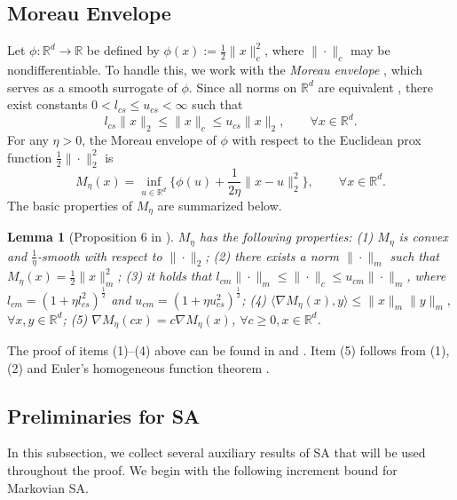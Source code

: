 \documentclass[11pt,letterpaper]{article}
\theoremstyle{plain}
\newtheorem{lemma}{Lemma}
\theoremstyle{definition}
\theoremstyle{remark}
\newcommand{\R}{\mathbb{R}}
\begin{document}
\subsection{Moreau Envelope}
Let $\phi:\R^d\to\R$ be defined by $\phi(x):=\tfrac12\|x\|_c^2$, where $\|\cdot\|_c$ may be nondifferentiable.  
To handle this, we work with the \emph{Moreau envelope} \citep{parikh2014proximal,chen2024lyapunov,chen2020finite}, which serves as a smooth surrogate of $\phi$.  
Since all norms on $\R^d$ are equivalent \citep{folland1999real}, there exist constants $0<l_{cs}\le u_{cs}<\infty$ such that
\[
l_{cs}\|x\|_2 \le \|x\|_c \le u_{cs}\|x\|_2,\qquad \forall x\in\R^d.
\]
For any $\eta>0$, the Moreau envelope of $\phi$ with respect to the Euclidean prox function $\tfrac12\|\cdot\|_2^2$ is
\begin{equation}\label{eq:Moreau-envelope}
M_\eta(x) = \inf_{u \in \R^d} \Big\{\phi(u) + \frac{1}{2\eta}\|x-u\|_2^2\Big\},\qquad \forall x\in \R^d.
\end{equation}
The basic properties of $M_{\eta}$ are summarized below. 
\begin{lemma}
[Proposition 6 in \cite{zhang2024prelimit}]\label{lem:Moreau-envelope}
$M_\eta$ has the following properties: (1) $M_\eta$ is convex and $\frac{1}{\eta}$-smooth with respect to $\|\cdot\|_2$; (2) there exists a norm $\|\cdot\|_m$ such that $M_\eta(x) = \frac{1}{2}\|x\|_m^2$; (3) it holds that $l_{cm}\|\cdot\|_m\leq \|\cdot\|_c \leq u_{cm}\|\cdot\|_m$, where $l_{cm} = (1+\eta l_{cs}^2)^{\frac{1}{2}} $ and $u_{cm} = (1+\eta u_{cs}^2)^{\frac{1}{2}}$; (4) $\langle \nabla M_\eta(x), y\rangle \leq \|x\|_m \|y\|_m,$ $\forall x, y \in \R^d$; (5) $\nabla M_\eta(cx) = c\nabla M_\eta(x)$, $\forall c \geq 0, x\in \R^d$.
\end{lemma}
The proof of items (1)--(4) above can be found in \cite[Proposition 1]{chen2024lyapunov} and \cite[Lemma A.1]{chen2020finite}. Item (5) follows from (1), (2) and Euler’s homogeneous function theorem \citep{euler2000foundations}.

\subsection{Preliminaries for SA}
In this subsection, we collect several auxiliary results of SA that will be used
throughout the proof. We begin with the following increment bound for
Markovian SA.
\end{document}
